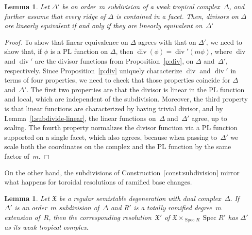 \documentclass[11pt]{amsart}
\newtheorem{lem}[thm]{Lemma}
\theoremstyle{definition}
\renewcommand{\div}{\operatorname{div}}
\newcommand{\Spec}{\operatorname{Spec}}
\newcommand{\X}{\mathfrak X}
\begin{document}
\begin{lem}\label{l:subdivide-lin-equiv}
Let $\Delta'$ be an order~$m$ subdivision of a weak tropical complex~$\Delta$,
and further assume that every ridge of $\Delta$ is contained in a facet.
Then, divisors on $\Delta$ are linearly equivalent if
and only if they are linearly equivalent on~$\Delta'$
\end{lem}

\begin{proof}
To show that linear equivalence on $\Delta$ agrees with that on $\Delta'$,
we need to show that, if $\phi$ is a PL function on $\Delta$, then
$\div(\phi) = \div'(m \phi)$, where $\div$ and $\div'$ are the divisor functions
from Proposition~\ref{p:div}, on $\Delta$ and~$\Delta'$, respectively. Since
Proposition~\ref{p:div} uniquely characterize $\div$ and $\div'$ in terms of
four properties, we need to check that those properties coincide for $\Delta$
and~$\Delta'$. The first two properties are that the divisor is linear in the PL
function and local, which are independent of the subdivision. Moreover, the
third property is that linear functions are characterized by having trivial
divisor, and by Lemma~\ref{l:subdivide-linear}, the linear functions on~$\Delta$
and~$\Delta'$ agree, up to scaling. The fourth property normalizes the divisor
function via a PL function supported on a single facet, which also agrees,
because when passing to~$\Delta'$ we scale both the coordinates on the complex
and the PL function by the same factor of~$m$.
\end{proof}

On the other hand, the subdivisions of Construction~\ref{const:subdivision}
mirror what happens for toroidal resolutions of ramified base changes.

\begin{lem}\label{l:subdivide-toroidal}
Let $\X$ be a regular semistable degeneration with dual complex~$\Delta$. If
$\Delta'$ is an order~$m$ subdivision of~$\Delta$ and $R'$ is a totally ramified
degree~$m$ extension of~$R$, then the corresponding resolution~$\X'$ of
$\X \times_{\Spec R} \Spec R'$ has $\Delta'$ as its weak tropical complex.
\end{lem}
\end{document}
